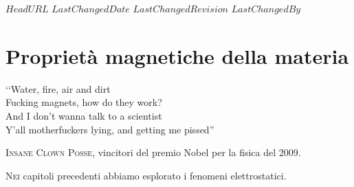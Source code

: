 \svnidlong
{$HeadURL$}
{$LastChangedDate$}
{$LastChangedRevision$}
{$LastChangedBy$}

\chapter{Proprietà magnetiche della materia}

\begin{introduction}
	‘‘Water, fire, air and dirt\\
	Fucking magnets, how do they work?\\
	And I don’t wanna talk to a scientist\\
	Y’all motherfuckers lying, and getting me pissed''
	\begin{flushright}
		\textsc{Insane Clown Posse}, vincitori del premio Nobel per la fisica del 2009.
	\end{flushright}
\end{introduction}
\lettrine[findent=1pt, nindent=0pt]{N}{ei} capitoli precedenti abbiamo esplorato i fenomeni elettrostatici. %

